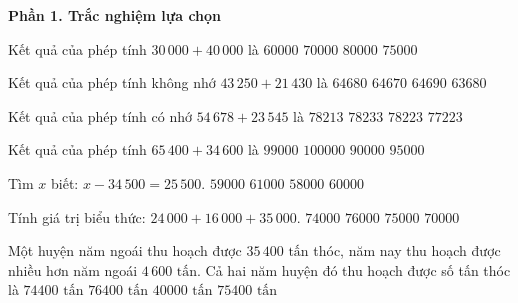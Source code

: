 \textbf{Phần 1. Trắc nghiệm lựa chọn}

\begin{ex} %
Kết quả của phép tính $30\,000 + 40\,000$ là
\choice
{$60000$}
{\True $70000$}
{$80000$}
{$75000$}
\end{ex}

\begin{ex} %
Kết quả của phép tính không nhớ $43\,250 + 21\,430$ là
\choice
{\True $64680$}
{$64670$}
{$64690$}
{$63680$}
\end{ex}

\begin{ex} %
Kết quả của phép tính có nhớ $54\,678 + 23\,545$ là
\choice
{$78213$}
{$78233$}
{\True $78223$}
{$77223$}
\end{ex}

\begin{ex} %
Kết quả của phép tính $65\,400 + 34\,600$ là
\choice
{$99000$}
{\True $100000$}
{$90000$}
{$95000$}
\end{ex}

\begin{ex} %
Tìm $x$ biết: $x - 34\,500 = 25\,500$.
\choice
{$59000$}
{$61000$}
{$58000$}
{\True $60000$}
\end{ex}

\begin{ex} %
Tính giá trị biểu thức: $24\,000 + 16\,000 + 35\,000$.
\choice
{$74000$}
{$76000$}
{\True $75000$}
{$70000$}
\end{ex}

\begin{ex} %
Một huyện năm ngoái thu hoạch được $35\,400\text{ tấn}$ thóc, năm nay thu hoạch được nhiều hơn năm ngoái $4\,600\text{ tấn}$. Cả hai năm huyện đó thu hoạch được số tấn thóc là
\choice
{$74400\text{ tấn}$}
{$76400\text{ tấn}$}
{$40000\text{ tấn}$}
{\True $75400\text{ tấn}$}
\end{ex}

